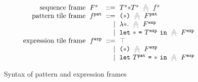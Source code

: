 \begin{figure}
  \vspace{-3px}
  \[\arraycolsep=3pt\begin{array}{rlrl}
    \text{sequence frame} & \tframe^s & ::= & \tframelit{\tiles^s\framehole\tiles^s}{\tfrelem^s} \\
    \text{pattern tile frame} & \tfrelem^{\pat} & ::= &
      \tframelit{\sparen{\framehole}}{\tframe^{\pat}} \\
    & & \vert &
      \tframelit{\tlam{\framehole}}{\tframe^{\expr}} \\
    & & \vert &
      \tframelit{\tlet{\framehole}{\tiles^{\expr}}}{\tframe^{\expr}} \\
    \text{expression tile frame} & \tfrelem^{\expr} & ::= &
      \froot \\
    & & \vert &
      \tframelit{\sparen{\framehole}}{\tframe^{\expr}} \\
    & & \vert &
      \tframelit{\tlet{\tiles^{\pat}}{\framehole}}{\tframe^{\expr}}
  \end{array}\]
  \caption{
    Syntax of pattern and expression frames
  }
  \label{fig:frame-syntax}
\end{figure}
